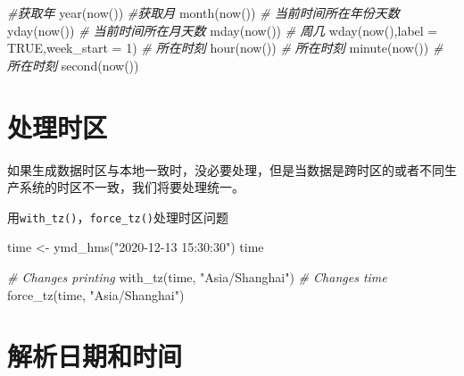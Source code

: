 \documentclass[
]{book}
\newenvironment{Shaded}{\begin{snugshade}}{\end{snugshade}}
\newcommand{\AttributeTok}[1]{\textcolor[rgb]{0.77,0.63,0.00}{#1}}
\newcommand{\CommentTok}[1]{\textcolor[rgb]{0.56,0.35,0.01}{\textit{#1}}}
\newcommand{\ConstantTok}[1]{\textcolor[rgb]{0.00,0.00,0.00}{#1}}
\newcommand{\DecValTok}[1]{\textcolor[rgb]{0.00,0.00,0.81}{#1}}
\newcommand{\FunctionTok}[1]{\textcolor[rgb]{0.00,0.00,0.00}{#1}}
\newcommand{\NormalTok}[1]{#1}
\newcommand{\OtherTok}[1]{\textcolor[rgb]{0.56,0.35,0.01}{#1}}
\newcommand{\StringTok}[1]{\textcolor[rgb]{0.31,0.60,0.02}{#1}}
\begin{document}
\begin{Shaded}
\begin{Highlighting}[]
\CommentTok{\#获取年}
\FunctionTok{year}\NormalTok{(}\FunctionTok{now}\NormalTok{())  }
\CommentTok{\#获取月}
\FunctionTok{month}\NormalTok{(}\FunctionTok{now}\NormalTok{())}
\CommentTok{\# 当前时间所在年份天数}
\FunctionTok{yday}\NormalTok{(}\FunctionTok{now}\NormalTok{())}
\CommentTok{\# 当前时间所在月天数}
\FunctionTok{mday}\NormalTok{(}\FunctionTok{now}\NormalTok{())}
\CommentTok{\# 周几}
\FunctionTok{wday}\NormalTok{(}\FunctionTok{now}\NormalTok{(),}\AttributeTok{label =} \ConstantTok{TRUE}\NormalTok{,}\AttributeTok{week\_start =} \DecValTok{1}\NormalTok{)}
\CommentTok{\# 所在时刻}
\FunctionTok{hour}\NormalTok{(}\FunctionTok{now}\NormalTok{())}
\CommentTok{\# 所在时刻}
\FunctionTok{minute}\NormalTok{(}\FunctionTok{now}\NormalTok{())}
\CommentTok{\# 所在时刻}
\FunctionTok{second}\NormalTok{(}\FunctionTok{now}\NormalTok{())}
\end{Highlighting}
\end{Shaded}

\hypertarget{ux5904ux7406ux65f6ux533a}{%
\section{处理时区}\label{ux5904ux7406ux65f6ux533a}}

如果生成数据时区与本地一致时，没必要处理，但是当数据是跨时区的或者不同生产系统的时区不一致，我们将要处理统一。

用\texttt{with\_tz()}，\texttt{force\_tz()}处理时区问题

\begin{Shaded}
\begin{Highlighting}[]
\NormalTok{time }\OtherTok{\textless{}{-}} \FunctionTok{ymd\_hms}\NormalTok{(}\StringTok{"2020{-}12{-}13 15:30:30"}\NormalTok{)}
\NormalTok{time}

\CommentTok{\# Changes printing}
\FunctionTok{with\_tz}\NormalTok{(time, }\StringTok{"Asia/Shanghai"}\NormalTok{)}
\CommentTok{\# Changes time}
\FunctionTok{force\_tz}\NormalTok{(time, }\StringTok{"Asia/Shanghai"}\NormalTok{)}
\end{Highlighting}
\end{Shaded}

\hypertarget{ux89e3ux6790ux65e5ux671fux548cux65f6ux95f4}{%
\section{解析日期和时间}\label{ux89e3ux6790ux65e5ux671fux548cux65f6ux95f4}}
\end{document}

